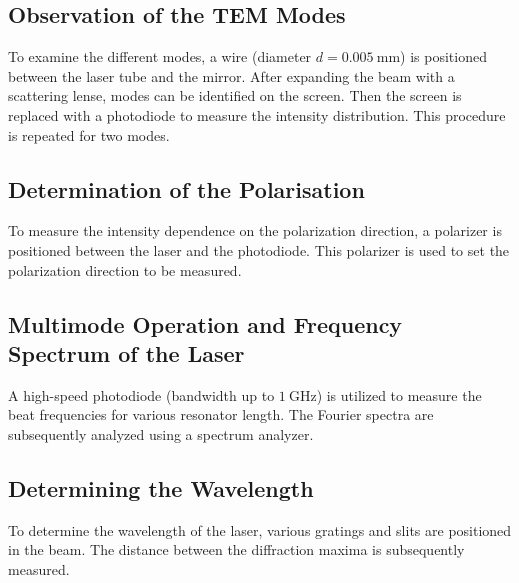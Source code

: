 \subsection{Observation of the TEM Modes}
To examine the different modes, a wire (diameter $d=\SI{0.005}{\milli\meter}$)
is positioned between the laser tube and the mirror. After expanding 
the beam with a scattering lense, modes can be identified on the screen. 
Then the screen is replaced with a photodiode to measure the intensity
distribution. This procedure is repeated for two modes.

\subsection{Determination of the Polarisation}
To measure the intensity dependence on the polarization direction, a 
polarizer is positioned between the laser and the photodiode. This 
polarizer is used to set the polarization direction to be measured.

\subsection{Multimode Operation and Frequency Spectrum of the Laser}

A high-speed photodiode (bandwidth up to $\SI{1}{\giga\hertz}$) is 
utilized to measure the beat frequencies for various resonator length. 
The Fourier spectra are subsequently analyzed using a spectrum analyzer.

\subsection{Determining the Wavelength}
To determine the wavelength of the laser, various gratings and slits are 
positioned in the beam. The distance between the diffraction maxima is 
subsequently measured.